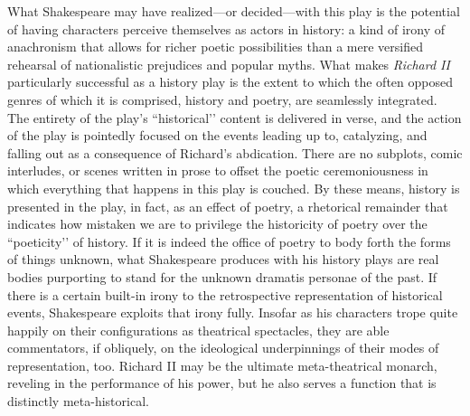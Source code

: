 What Shakespeare may have realized---or decided---with this play is the potential of having characters perceive themselves as actors in history: a kind of irony of anachronism that allows for richer poetic possibilities than a mere versified rehearsal of nationalistic prejudices and popular myths.
What makes \emph{Richard II} particularly successful as a history play is the extent to which the often opposed genres of which it is comprised, history and poetry, are seamlessly integrated.
The entirety of the play’s ``historical’’ content is delivered in verse, and the action of the play is pointedly focused on the events leading up to, catalyzing, and falling out as a consequence of Richard’s abdication.
There are no subplots, comic interludes, or scenes written in prose to offset the poetic ceremoniousness in which everything that happens in this play is couched.
By these means, history is presented in the play, in fact, as an effect of poetry, a rhetorical remainder that indicates how mistaken we are to privilege the historicity of poetry over the ``poeticity’’ of history.
If it is indeed the office of poetry to body forth the forms of things unknown, what Shakespeare produces with his history plays are real bodies purporting to stand for the unknown dramatis personae of the past.
If there is a certain built-in irony to the retrospective representation of historical events, Shakespeare exploits that irony fully.
Insofar as his characters trope quite happily on their configurations as theatrical spectacles, they are able commentators, if obliquely, on the ideological underpinnings of their modes of representation, too.
Richard II may be the ultimate meta-theatrical monarch, reveling in the performance of his power, but he also serves a function that is distinctly meta-historical.

